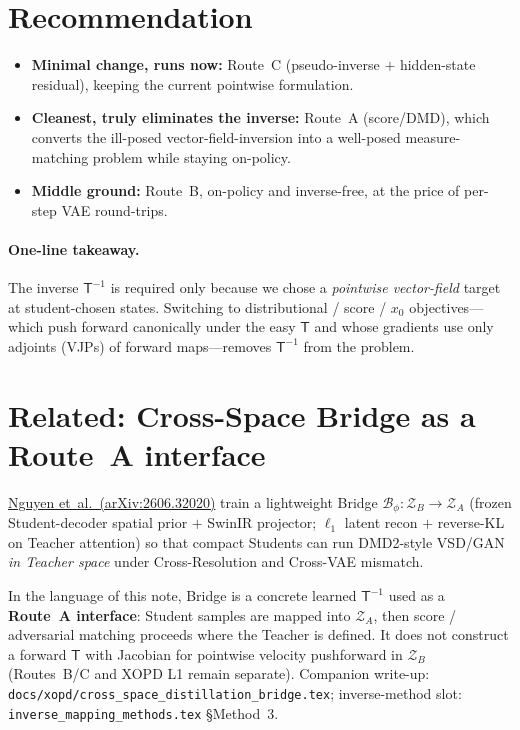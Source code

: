 \documentclass[11pt,a4paper]{article}
\newcommand{\Za}{\mathcal{Z}_{A}}
\newcommand{\Zb}{\mathcal{Z}_{B}}
\newcommand{\Tmap}{\mathsf{T}}
\newcommand{\Tinv}{\mathsf{T}^{-1}}
\theoremstyle{definition}
\begin{document}
\section{Recommendation}
\label{sec:reco}

\begin{itemize}[leftmargin=1.4em,itemsep=2pt]
  \item \textbf{Minimal change, runs now:} Route~C (pseudo-inverse $+$ hidden-state residual),
        keeping the current pointwise formulation.
  \item \textbf{Cleanest, truly eliminates the inverse:} Route~A (score/DMD), which converts the
        ill-posed vector-field-inversion into a well-posed measure-matching problem while staying
        on-policy.
  \item \textbf{Middle ground:} Route~B, on-policy and inverse-free, at the price of per-step VAE
        round-trips.
\end{itemize}

\paragraph{One-line takeaway.}
The inverse $\Tinv$ is required only because we chose a \emph{pointwise vector-field} target at
student-chosen states. Switching to distributional / score / $x_0$ objectives---which push
forward canonically under the easy $\Tmap$ and whose gradients use only adjoints (VJPs) of
forward maps---removes $\Tinv$ from the problem.

\section{Related: Cross-Space Bridge as a Route~A interface}
\label{sec:bridge-related}

\href{https://arxiv.org/abs/2606.32020}{Nguyen et~al.\ (arXiv:2606.32020)} train a lightweight
Bridge $\mathcal{B}_\phi:\Zb\to\Za$ (frozen Student-decoder spatial prior $+$ SwinIR projector;
$\ell_1$ latent recon $+$ reverse-KL on Teacher attention) so that compact Students can run
DMD2-style VSD/GAN \emph{in Teacher space} under Cross-Resolution and Cross-VAE mismatch.

In the language of this note, Bridge is a concrete learned $\Tinv$ used as a
\textbf{Route~A interface}: Student samples are mapped into $\Za$, then score / adversarial
matching proceeds where the Teacher is defined. It does not construct a forward $\Tmap$ with
Jacobian for pointwise velocity pushforward in $\Zb$ (Routes~B/C and XOPD L1 remain separate).
Companion write-up: \texttt{docs/xopd/cross\_space\_distillation\_bridge.tex}; inverse-method
slot: \texttt{inverse\_mapping\_methods.tex} \S Method~3.
\end{document}
